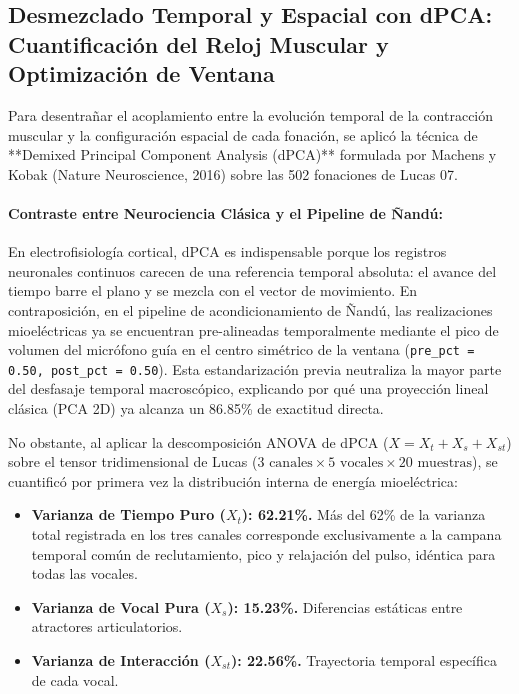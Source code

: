 \documentclass[11pt,a4paper,openany]{book}
\theoremstyle{definition}
\begin{document}
\subsection{Desmezclado Temporal y Espacial con dPCA: Cuantificación del Reloj Muscular y Optimización de Ventana}
\label{subsec:dpca_analisis_ventana}

Para desentrañar el acoplamiento entre la evolución temporal de la contracción muscular y la configuración espacial de cada fonación, se aplicó la técnica de **Demixed Principal Component Analysis (dPCA)** formulada por Machens y Kobak (Nature Neuroscience, 2016) sobre las 502 fonaciones de Lucas 07.

\paragraph{Contraste entre Neurociencia Clásica y el Pipeline de Ñandú:}
En electrofisiología cortical, dPCA es indispensable porque los registros neuronales continuos carecen de una referencia temporal absoluta: el avance del tiempo barre el plano y se mezcla con el vector de movimiento. En contraposición, en el pipeline de acondicionamiento de Ñandú, las realizaciones mioeléctricas ya se encuentran pre-alineadas temporalmente mediante el pico de volumen del micrófono guía en el centro simétrico de la ventana (\texttt{pre\_pct = 0.50, post\_pct = 0.50}). Esta estandarización previa neutraliza la mayor parte del desfasaje temporal macroscópico, explicando por qué una proyección lineal clásica (PCA 2D) ya alcanza un 86.85\% de exactitud directa.

No obstante, al aplicar la descomposición ANOVA de dPCA ($X = X_t + X_s + X_{st}$) sobre el tensor tridimensional de Lucas ($3 \text{ canales} \times 5 \text{ vocales} \times 20 \text{ muestras}$), se cuantificó por primera vez la distribución interna de energía mioeléctrica:
\begin{itemize}
    \item \textbf{Varianza de Tiempo Puro ($X_t$): 62.21\%.} Más del 62\% de la varianza total registrada en los tres canales corresponde exclusivamente a la campana temporal común de reclutamiento, pico y relajación del pulso, idéntica para todas las vocales.
    \item \textbf{Varianza de Vocal Pura ($X_s$): 15.23\%.} Diferencias estáticas entre atractores articulatorios.
    \item \textbf{Varianza de Interacción ($X_{st}$): 22.56\%.} Trayectoria temporal específica de cada vocal.
\end{itemize}
\end{document}
